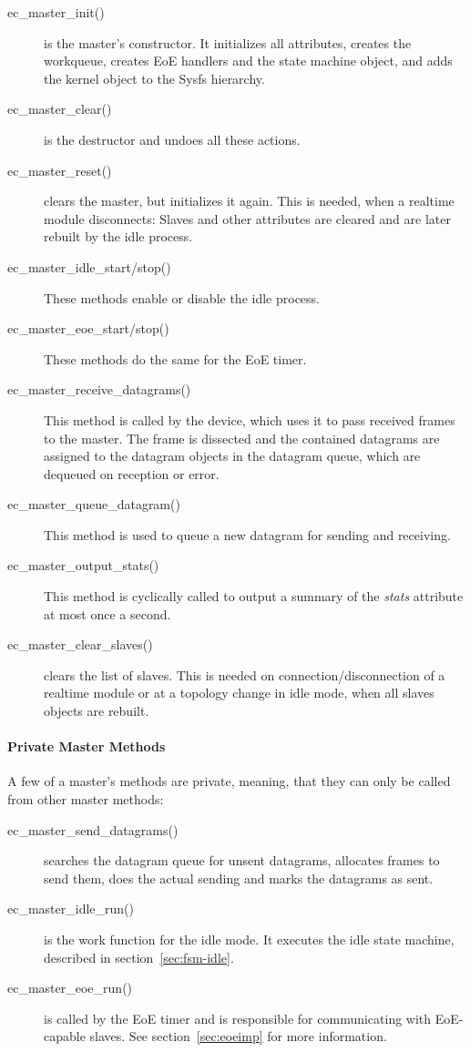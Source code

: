\documentclass[a4paper,12pt,BCOR6mm,bibtotoc,idxtotoc]{scrbook}
\begin{document}
\begin{description}
\item[ec\_master\_init()] is the master's constructor. It initializes
  all attributes, creates the workqueue, creates EoE handlers and the
  state machine object, and adds the kernel object to the Sysfs
  hierarchy.
\item[ec\_master\_clear()] is the destructor and undoes all these
  actions.
\item[ec\_master\_reset()] clears the master, but initializes it
  again. This is needed, when a realtime module disconnects: Slaves
  and other attributes are cleared and are later rebuilt by the idle
  process.
\item[ec\_master\_idle\_start/stop()] These methods enable or disable
  the idle process.
\item[ec\_master\_eoe\_start/stop()] These methods do the same for the
  EoE timer.
\item[ec\_master\_receive\_datagrams()] This method is called by the
  device, which uses it to pass received frames to the master.  The
  frame is dissected and the contained datagrams are assigned to the
  datagram objects in the datagram queue, which are dequeued on
  reception or error.
\item[ec\_master\_queue\_datagram()] This method is used to queue a
  new datagram for sending and receiving.
\item[ec\_master\_output\_stats()] This method is cyclically called to
  output a summary of the \textit{stats} attribute at most once a
  second.
\item[ec\_master\_clear\_slaves()] clears the list of slaves. This is
  needed on connection/disconnection of a realtime module or at a
  topology change in idle mode, when all slaves objects are rebuilt.
\end{description}

\paragraph{Private Master Methods}

A few of a master's methods are private, meaning, that they can only
be called from other master methods:

\begin{description}
\item[ec\_master\_send\_datagrams()] searches the datagram queue for
  unsent datagrams, allocates frames to send them, does the actual
  sending and marks the datagrams as sent.
\item[ec\_master\_idle\_run()] is the work function for the idle mode.
  It executes the idle state machine, described in
  section~\ref{sec:fsm-idle}.
\item[ec\_master\_eoe\_run()] is called by the EoE timer and is
  responsible for communicating with EoE-capable slaves. See
  section~\ref{sec:eoeimp} for more information.
\end{description}
\end{document}
